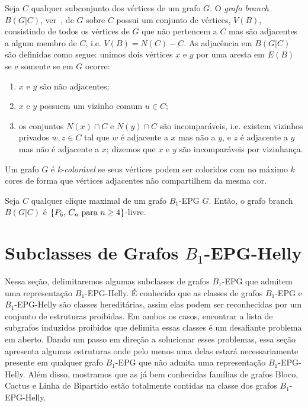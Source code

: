 Seja $C$ qualquer subconjunto dos vértices de um grafo $G$. O \textit{grafo branch} $B(G|C)$, ver~\cite{golumbic2009}, de $G$ sobre $C$ possui um conjunto de vértices, $V(B)$, consistindo de todos os vértices de $G$ que não pertencem a $C$ mas são adjacentes a algum membro de  $C$, i.e. $V(B) = N(C) - C$. As adjacência em $B(G|C)$ são definidas como segue: unimos dois vértices $x$ e $y$ por uma aresta em  $E(B)$ se e somente se em $G$ ocorre:
\begin{enumerate}
    \item  $x$ e $y$ são não adjacentes;
    \item $x$ e $y$ possuem um vizinho comum $u \in C$;
    \item os conjuntos $N(x) \cap C$ e $N(y) \cap C$ são incomparáveis, i.e. existem vizinhos privados $w, z \in C$ tal que $w$ é adjacente a $x$ mas não a $y$, e $z$ é adjacente a $y$ mas não é adjacente a $x$; dizemos que $x$ e $y$ são incomparáveis por vizinhança.
\end{enumerate}

Um grafo $G$ é \textit{k-colorável} se seus vértices podem ser coloridos com no máximo $k$ cores de forma que vértices adjacentes não compartilhem da mesma cor.

\begin{lema} \label{l:branch} Seja $C$ qualquer clique maximal de um grafo $B_1$-EPG $G$. Então, o grafo branch $B(G|C)$ é $\{P_6, \, C_n \hbox{ para }  n\geq 4\}$-livre.
\end{lema}





\section{Subclasses de Grafos $B_1$-EPG-Helly}

Nessa seção, delimitaremos algumas subclasses de grafos  $B_1$-EPG que admitem uma representação $B_1$-EPG-Helly. É conhecido que as classes de grafos $B_1$-EPG e $B_1$-EPG-Helly são classes hereditárias, assim elas podem ser reconhecidas por um conjunto de estruturas proibidas. 
Em ambos os casos, encontrar a lista de subgrafos induzidos proibidos que delimita essas classes é um desafiante problema em aberto. 
Dando um passo em direção a solucionar esses problemas, essa seção apresenta algumas estruturas onde pelo menos uma delas estará necessariamente presente em qualquer grafo $B_1$-EPG que não admita uma representação $B_1$-EPG-Helly. Além disso, mostramos que as já bem conhecidas famílias de grafos Bloco, Cactus e Linha de Bipartido estão totalmente contidas na classe dos grafos  $B_1$-EPG-Helly.


